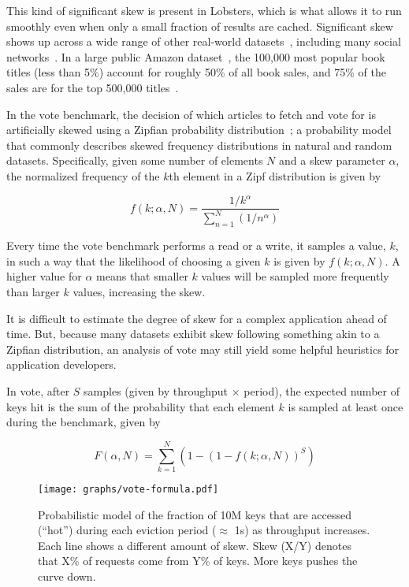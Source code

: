 This kind of significant skew is present in Lobsters, which is what allows it to
run smoothly even when only a small fraction of results are cached. Significant
skew shows up across a wide range of other real-world
datasets~\cite{power1,power2,network-skew,large-skew-analysis}, including many
social networks~\cite{network-skew2, community-skew}. In a large public Amazon
dataset~\cite{amazon-skew}, the 100,000 most popular book titles (less than 5\%)
account for roughly 50\% of all book sales, and 75\% of the sales are for the
top 500,000 titles~\cite{zhang2020permutation}.

In the vote benchmark, the decision of which articles to fetch and vote for is
artificially skewed using a Zipfian probability distribution~\cite{zipf}; a
probability model that commonly describes skewed frequency distributions in
natural and random datasets. Specifically, given some number of elements $N$ and
a skew parameter $\alpha$, the normalized frequency of the $k$th element in a
Zipf distribution is given by

\begin{displaymath}
  f\left(k;\alpha,N\right)={\frac {1/k^{\alpha}}{\sum \limits _{n=1}^{N}(1/n^{\alpha})}}
\end{displaymath}

Every time the vote benchmark performs a read or a write, it samples a value,
$k$, in such a way that the likelihood of choosing a given $k$ is given by
$f\left(k;\alpha,N\right)$. A higher value for $\alpha$ means that smaller $k$
values will be sampled more frequently than larger $k$ values, increasing the
skew.

It is difficult to estimate the degree of skew for a complex application ahead
of time. But, because many datasets exhibit skew following something akin to a
Zipfian distribution, an analysis of vote may still yield some helpful
heuristics for application developers.

In vote, after $S$ samples (given by throughput $\times$ period), the expected
number of keys hit is the sum of the probability that each element $k$ is
sampled at least once during the benchmark, given by

\begin{displaymath}
  F(\alpha,N)={\sum \limits _{k=1}^{N} \left(1 - \left(1 - f(k; \alpha, N)\right)^{S}\right)}
\end{displaymath}

\begin{figure}[h]
  \centering
  \texttt{[image: graphs/vote-formula.pdf]}
  \caption{Probabilistic model of the fraction of 10M keys that are accessed
  (``hot'') during each eviction period ($\approx$ 1s) as throughput increases.
  Each line shows a different amount of skew. Skew (X/Y) denotes that X\% of
  requests come from Y\% of keys. More keys pushes the curve down.}
  \label{f:vote-formula}
\end{figure}

